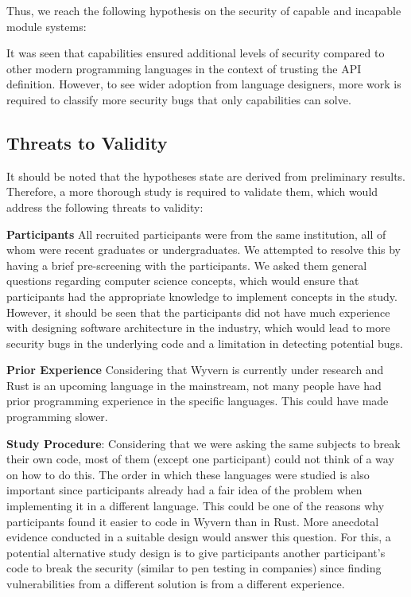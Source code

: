 \noindent
Thus, we reach the following hypothesis on the security of capable and incapable module systems: 

\begin{hyp}[Security]
It was seen that capabilities ensured additional levels of security compared to other modern programming languages in the context of trusting the API definition. However, to see wider adoption from language designers, more work is required to classify more security bugs that only capabilities can solve. 
\end{hyp}
\subsection{Threats to Validity}
\noindent
It should be noted that the hypotheses state are derived from preliminary results. Therefore, a more thorough study is required to validate them, which would address the following threats to validity:

\noindent
\textbf{Participants} All recruited participants were from the same institution, all of whom were recent graduates or undergraduates. We attempted to resolve this by having a brief pre-screening with the participants. We asked them general questions regarding computer science concepts, which would ensure that participants had the appropriate knowledge to implement concepts in the study. However, it should be seen that the participants did not have much experience with designing software architecture in the industry, which would lead to more security bugs in the underlying code and a limitation in detecting potential bugs. 

\noindent
\textbf{Prior Experience} Considering that Wyvern is currently under research and Rust is an upcoming language in the mainstream, not many people have had prior programming experience in the specific languages. This could have made programming slower.

\noindent
\textbf{Study Procedure}: Considering that we were asking the same subjects to break their own code, most of them (except one participant) could not think of a way on how to do this. The order in which these languages were studied is also important since participants already had a fair idea of the problem when implementing it in a different language. This could be one of the reasons why participants found it easier to code in Wyvern than in Rust. More anecdotal evidence conducted in a suitable design would answer this question. For this, a potential alternative study design is to give participants another participant's code to break the security (similar to pen testing in companies) since finding vulnerabilities from a different solution is from a different experience. %